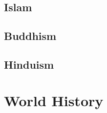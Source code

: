 				
		\subsection{Islam}
		\subsection{Buddhism}
		\subsection{Hinduism}
		\subsection{}
	\section{World History}
	